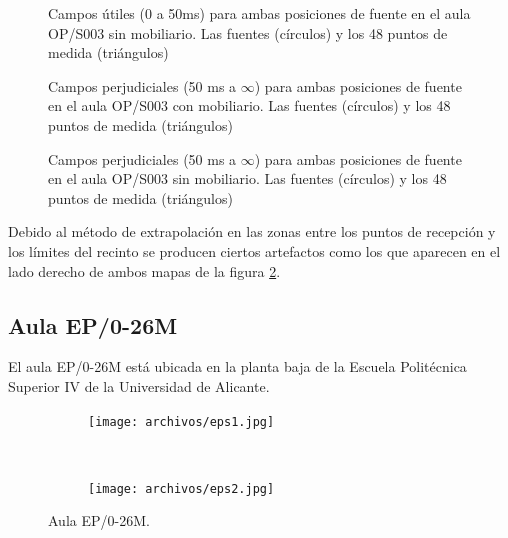 \begin{figure}[H]
    \centering%
        {%
    }
    \caption{Campos útiles (0 a 50ms) para ambas posiciones de fuente en el aula OP/S003 sin mobiliario. Las fuentes (círculos) y los 48 puntos de medida (triángulos)}
    \label{graf:mapaoputilsin}%
\end{figure}



\begin{figure}[H]
    \centering%
        {%
    }
    \caption{Campos perjudiciales (50 ms a $\infty$) para ambas posiciones de fuente en el aula OP/S003 con mobiliario. Las fuentes (círculos) y los 48 puntos de medida (triángulos)}
    \label{graf:mapaopperjudicialcon}%
\end{figure}

\begin{figure}[H]
    \centering%
        {%
    }
    \caption{Campos perjudiciales (50 ms a $\infty$) para ambas posiciones de fuente en el aula OP/S003 sin mobiliario. Las fuentes (círculos) y los 48 puntos de medida (triángulos)}
    \label{graf:mapaopperjudicialsin}%
\end{figure}

Debido al método de extrapolación en las zonas entre los puntos de recepción y los límites del recinto se producen ciertos artefactos como los que aparecen en el lado derecho de ambos mapas de la figura \ref{graf:mapaopperjudicialcon}.

\subsection{Aula EP/0-26M}

El aula EP/0-26M está ubicada en la planta baja de la Escuela Politécnica Superior IV de la Universidad de Alicante.

\begin{figure}[ht]
    \centering
    \begin{subfigure}[b]{0.4\textwidth}
    	\centering
        \texttt{[image: archivos/eps1.jpg]}
    \end{subfigure}
    ~ %
    \begin{subfigure}[b]{0.4\textwidth}
    	\centering
        \texttt{[image: archivos/eps2.jpg]}
    \end{subfigure}
    \caption{Aula EP/0-26M.}\label{fotoseps}
\end{figure}
\FloatBarrier 


